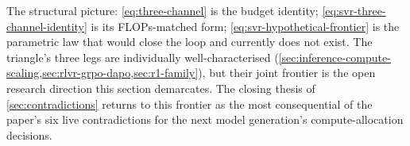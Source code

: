 The structural picture: \cref{eq:three-channel} is the budget
identity; \cref{eq:svr-three-channel-identity} is its FLOPs-matched
form; \cref{eq:svr-hypothetical-frontier} is the parametric law that
would close the loop and currently does not exist. The triangle's
three legs are individually well-characterised
(\cref{sec:inference-compute-scaling,sec:rlvr-grpo-dapo,sec:r1-family}),
but their joint frontier is the open research direction this section
demarcates. The closing thesis of \cref{sec:contradictions} returns
to this frontier as the most consequential of the paper's six live
contradictions for the next model generation's compute-allocation
decisions.

